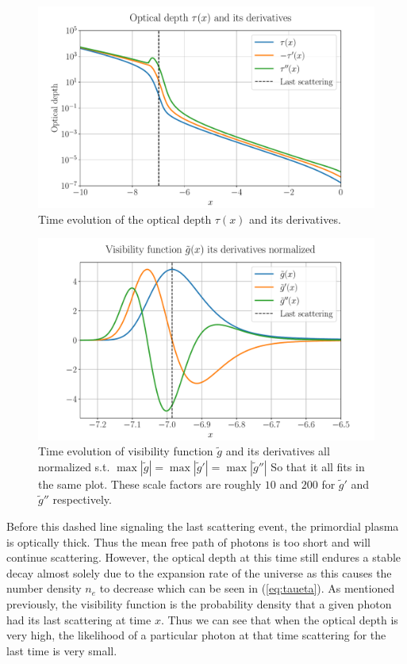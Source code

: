 \documentclass[%
reprint,
 amsmath,amssymb,
 aps,
]{revtex4-2}
\begin{document}
\begin{figure}[ht!]
	\includegraphics[width = \linewidth]{Figures/tau_and_derivs.pdf}
	\caption{Time evolution of the optical depth $\tau(x)$ and its derivatives.}
	\label{fig:tau}
\end{figure}
\begin{figure}[ht!]
	\includegraphics[width = \linewidth]{Figures/gtilde.pdf}
	\caption{Time evolution of visibility function $\tilde g$ and its derivatives all normalized s.t. $\max|\tilde g|=\max|\tilde g'|=\max|\tilde g''|$ So that it all fits in the same plot. These scale factors are roughly $10$ and $200$ for $\tilde g'$ and $\tilde g''$ respectively.}
	\label{fig:gtilde}
\end{figure}

Before this dashed line signaling the last scattering event, the primordial plasma is optically thick. Thus the mean free path of photons is too short and will continue scattering. However, the optical depth at this time still endures a stable decay almost solely due to the expansion rate of the universe as this causes the number density $n_e$ to decrease which can be seen in (\ref{eq:taueta}). As mentioned previously, the visibility function is the probability density that a given photon had its last scattering at time $x$. Thus we can see that when the optical depth is very high, the likelihood of a particular photon at that time scattering for the last time is very small. 
\end{document}
